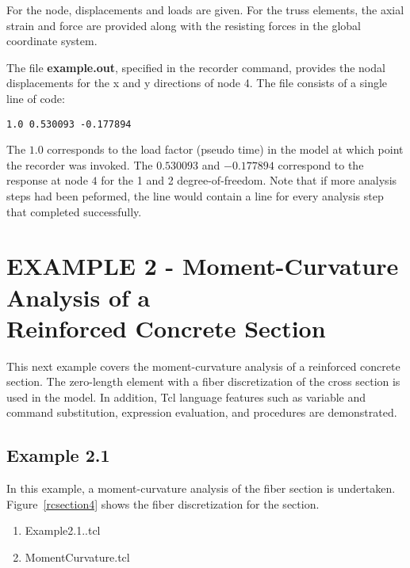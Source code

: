 \documentclass[12pt]{article}
\begin{document}
For the node, displacements and loads are given.  For the truss
elements, the axial strain and force are provided along with the 
resisting forces in the global coordinate system.


The file {\bf example.out}, specified in the recorder command, provides the nodal 
displacements for the x and y directions of node 4. The file consists of a single line of code:
\vspace{0.2in} 

{\sf\small
\begin{verbatim}
1.0 0.530093 -0.177894 
\end{verbatim}
}

The $1.0$ corresponds to the load factor (pseudo time) in the model at which point 
the recorder was invoked. The $0.530093$ and $-0.177894$ correspond to the response
at node $4$ for the 1 and 2 degree-of-freedom. Note that if more analysis steps had been 
peformed, the line would contain a line for every analysis step that completed successfully.

\pagebreak
\section{EXAMPLE 2 - Moment-Curvature Analysis of a \\ 
Reinforced Concrete Section} 

This next example covers the moment-curvature analysis of a reinforced 
concrete section. The zero-length element with a fiber discretization
of the cross section is used in the model. In addition, Tcl language 
features such as variable and command substitution, expression
evaluation, and procedures are demonstrated.

\subsection{Example 2.1}
In this example, a moment-curvature analysis of the fiber
section is undertaken. Figure~\ref{rcsection4}
shows the fiber discretization for the section.

\vspace{0.2in}  
\begin{enumerate} 
\item Example2.1..tcl
\item MomentCurvature.tcl
\end{enumerate}

\vspace{0.2in} 
\end{document}

